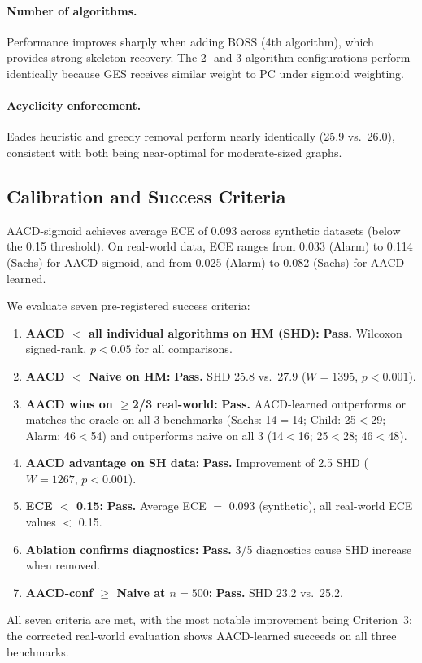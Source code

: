 \documentclass{article}
\newcommand{\aacd}{\textsc{AACD}}
\begin{document}
\paragraph{Number of algorithms.} Performance improves sharply when adding BOSS (4th algorithm), which provides strong skeleton recovery. The 2- and 3-algorithm configurations perform identically because GES receives similar weight to PC under sigmoid weighting.

\paragraph{Acyclicity enforcement.} Eades heuristic and greedy removal perform nearly identically (25.9 vs.\ 26.0), consistent with both being near-optimal for moderate-sized graphs.

\subsection{Calibration and Success Criteria}

\aacd{}-sigmoid achieves average ECE of 0.093 across synthetic datasets (below the 0.15 threshold). On real-world data, ECE ranges from 0.033 (Alarm) to 0.114 (Sachs) for \aacd{}-sigmoid, and from 0.025 (Alarm) to 0.082 (Sachs) for \aacd{}-learned.

We evaluate seven pre-registered success criteria:
\begin{enumerate}
    \item \textbf{AACD $<$ all individual algorithms on HM (SHD):} \textbf{Pass.} Wilcoxon signed-rank, $p < 0.05$ for all comparisons.
    \item \textbf{AACD $<$ Naive on HM:} \textbf{Pass.} SHD 25.8 vs.\ 27.9 ($W=1395$, $p < 0.001$).
    \item \textbf{AACD wins on $\geq$2/3 real-world:} \textbf{Pass.} \aacd{}-learned outperforms or matches the oracle on all 3 benchmarks (Sachs: 14$=$14; Child: 25$<$29; Alarm: 46$<$54) and outperforms naive on all 3 (14$<$16; 25$<$28; 46$<$48).
    \item \textbf{AACD advantage on SH data:} \textbf{Pass.} Improvement of 2.5 SHD ($W=1267$, $p < 0.001$).
    \item \textbf{ECE $<$ 0.15:} \textbf{Pass.} Average ECE $=$ 0.093 (synthetic), all real-world ECE values $<$ 0.15.
    \item \textbf{Ablation confirms diagnostics:} \textbf{Pass.} 3/5 diagnostics cause SHD increase when removed.
    \item \textbf{AACD-conf $\geq$ Naive at $n{=}500$:} \textbf{Pass.} SHD 23.2 vs.\ 25.2.
\end{enumerate}
All seven criteria are met, with the most notable improvement being Criterion~3: the corrected real-world evaluation shows \aacd{}-learned succeeds on all three benchmarks.
\end{document}
